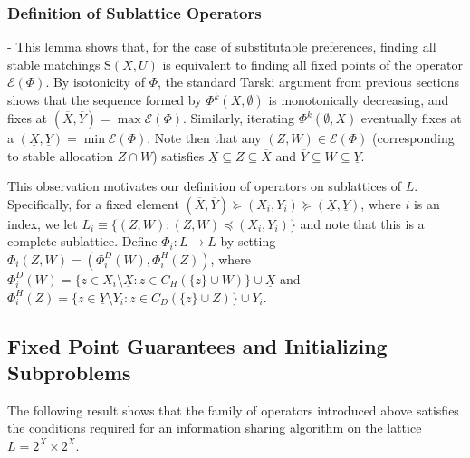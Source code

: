 \documentclass[11pt,reqno]{amsart}
\theoremstyle{definition}
\numberwithin{equation}{section}
\newcommand{\ol}{\overline}
\newcommand{\ul}{\underline}
\newcommand{\sub}{\subseteq}
\newcommand{\stable}{\mathrm{S}(X,U)}
\newcommand{\fix}{\mathcal{E}}
\newcommand{\suq}{\succeq}
\newcommand{\peq}{\preceq}
\newcommand{\lattice}{L}
\newcommand{\topx}{\ol{X}}
\newcommand{\topy}{\ol{Y}}
\newcommand{\botx}{\ul{X}}
\newcommand{\boty}{\ul{Y}}
\begin{document}
\subsubsection{Definition of Sublattice Operators} - This lemma shows that, for the case of substitutable preferences, finding all stable matchings $\stable$ is equivalent to finding all fixed points of the operator $\fix(\Phi)$.
By isotonicity of $\Phi$, the standard Tarski argument from previous sections shows that the sequence formed by $\Phi^k(X, \emptyset)$ is monotonically decreasing, and fixes at $(\topx, \topy) = \max \fix(\Phi)$.
Similarly, iterating $\Phi^k(\emptyset, X)$ eventually fixes at a $(\botx, \boty) = \min \fix( \Phi)$.
Note then that any $(Z,W) \in \fix(\Phi)$ (corresponding to stable allocation $Z \cap W$) satisfies $\botx \sub Z \sub \topx$ and $\topy \sub W \sub \boty$.

This observation motivates our definition of operators on sublattices of $\lattice$.
Specifically, for a fixed element $(\topx, \topy) \suq (X_i, Y_i) \suq (\botx, \boty)$, where $i$ is an index, we let $\lattice_i \equiv \{(Z,W): (Z,W) \peq (X_i, Y_i) \}$ and note that this is a complete sublattice.
Define $\Phi_i: \lattice \to \lattice$ by setting $\Phi_i(Z,W) = (\Phi^D_i(W), \Phi^H_i(Z))$, where $\Phi^D_i(W) = \{z \in X_i \setminus \botx: z \in C_H(\{z\} \cup W) \} \cup \botx$ and $\Phi^H_i(Z) = \{z \in \boty \setminus Y_i: z \in C_D( \{z \} \cup Z ) \} \cup Y_i$.

\subsection{Fixed Point Guarantees and Initializing Subproblems}

The following result shows that the family of operators introduced above satisfies the conditions required for an information sharing algorithm on the lattice $\lattice = 2^X \times 2^X$. 
\end{document}

